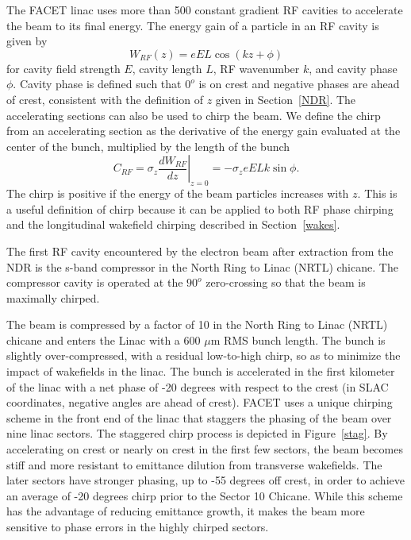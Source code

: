 \documentclass[%
twocolumn,
showpacs,preprintnumbers,
 aps,
prstab,
]{revtex4-1}
\begin{document}
The FACET linac uses more than 500 constant gradient RF cavities to accelerate the beam to its final energy. The energy gain of a particle in an RF cavity is given by
\begin{equation}
W_{RF}(z) = e E L \cos(kz + \phi)
\end{equation}
for cavity field strength $E$, cavity length $L$, RF wavenumber $k$, and cavity phase $\phi$. Cavity phase is defined such that $0^o$ is on crest and negative phases are ahead of crest, consistent with the definition of $z$ given in Section~\ref{NDR}. The accelerating sections can also be used to chirp the beam. We define the chirp from an accelerating section as the derivative of the energy gain evaluated at the center of the bunch, multiplied by the length of the bunch
\begin{equation}
C_{RF} = \sigma_z \left. \frac{dW_{RF}}{dz} \right|_{z=0} = -\sigma_z e E L k \sin{\phi}.
\end{equation}
The chirp is positive if the energy of the beam particles increases with $z$. This is a useful definition of chirp because it can be applied to both RF phase chirping and the longitudinal wakefield chirping described in Section~\ref{wakes}.

The first RF cavity encountered by the electron beam after extraction from the NDR is the s-band compressor in the North Ring to Linac (NRTL) chicane. The compressor cavity is operated at the $90^o$ zero-crossing so that the beam is maximally chirped. 

The beam is compressed by a factor of 10 in the North Ring to Linac (NRTL) chicane and enters the Linac with a 600 $\mu$m RMS bunch length. The bunch is slightly over-compressed, with a residual low-to-high chirp, so as to minimize the impact of wakefields in the linac. The bunch is accelerated in the first kilometer of the linac with a net phase of -20 degrees with respect to the crest (in SLAC coordinates, negative angles are ahead of crest). FACET uses a unique chirping scheme in the front end of the linac that staggers the phasing of the beam over nine linac sectors. The staggered chirp process is depicted in Figure~\ref{stag}. By accelerating on crest or nearly on crest in the first few sectors, the beam becomes stiff and more resistant to emittance dilution from transverse wakefields. The later sectors have stronger phasing, up to -55 degrees off crest, in order to achieve an average of -20 degrees chirp prior to the Sector 10 Chicane. While this scheme has the advantage of reducing emittance growth, it makes the beam more sensitive to phase errors in the highly chirped sectors.
\end{document}
